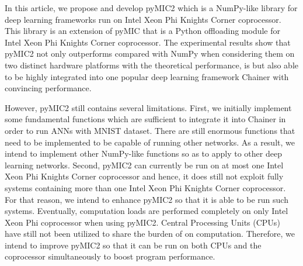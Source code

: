 \label{conclusion}
In this article, we propose and develop pyMIC2 which is a NumPy-like library for deep learning frameworks run on Intel Xeon Phi Knights Corner coprocessor. This library is an extension of pyMIC that is a Python offloading module for Intel Xeon Phi Knights Corner coprocessor. The experimental results show that pyMIC2 not only outperforms compared with NumPy when considering them on two distinct hardware platforms with the theoretical performance, is but also able to be highly integrated into one popular deep learning framework Chainer with convincing performance. 

However, pyMIC2 still contains several limitations. First, we initially implement some fundamental functions which are sufficient to integrate it into Chainer in order to run ANNs with MNIST dataset. There are still enormous functions that need to be implemented to be capable of running other networks. As a result, we intend to implement other NumPy-like functions so as to apply to other deep learning networks. Second, pyMIC2 can currently be run on at most one Intel Xeon Phi Knights Corner coprocessor and hence, it does still not exploit fully systems containing more than one Intel Xeon Phi Knights Corner coprocessor. For that reason, we intend to enhance pyMIC2 so that it is able to be run such systems. Eventually, computation loads are performed completely on only Intel Xeon Phi coprocessor when using pyMIC2. Central Processing Units (CPUs) have still not been utilized to share the burden of on computation. Therefore, we intend to improve pyMIC2 so that it can be run on both CPUs and the coprocessor simultaneously to boost program performance. 